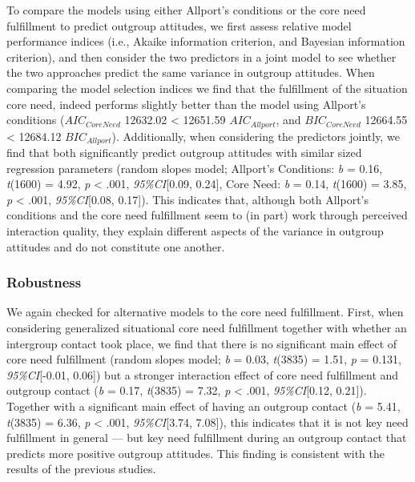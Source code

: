 \documentclass[man, 12pt, a4paper]{apa7}
\theoremstyle{break}
\theoremstyle{plain}
\begin{document}
To compare the models using either Allport's conditions or the core need
fulfillment to predict outgroup attitudes, we first assess relative
model performance indices (i.e., Akaike information criterion, and
Bayesian information criterion), and then consider the two predictors in
a joint model to see whether the two approaches predict the same
variance in outgroup attitudes. When comparing the model selection
indices we find that the fulfillment of the situation core need, indeed
performs slightly better than the model using Allport's conditions
(\(AIC_{CoreNeed}\) 12632.02 \textless{} 12651.59 \(AIC_{Allport}\), and
\(BIC_{CoreNeed}\) 12664.55 \textless{} 12684.12 \(BIC_{Allport}\)).
Additionally, when considering the predictors jointly, we find that both
significantly predict outgroup attitudes with similar sized regression
parameters (random slopes model; Allport's Conditions: \textit{b} =
0.16, \textit{t}(1600) = 4.92, \textit{p} \textless{} .001,
\textit{95\%CI}{[}0.09, 0.24{]}, Core Need: \textit{b} = 0.14,
\textit{t}(1600) = 3.85, \textit{p} \textless{} .001,
\textit{95\%CI}{[}0.08, 0.17{]}). This indicates that, although both
Allport's conditions and the core need fulfillment seem to (in part)
work through perceived interaction quality, they explain different
aspects of the variance in outgroup attitudes and do not constitute one
another.

\subsubsection{Robustness}

We again checked for alternative models to the core need fulfillment.
First, when considering generalized situational core need fulfillment
together with whether an intergroup contact took place, we find that
there is no significant main effect of core need fulfillment (random
slopes model; \textit{b} = 0.03, \textit{t}(3835) = 1.51, \textit{p} =
0.131, \textit{95\%CI}{[}-0.01, 0.06{]}) but a stronger interaction
effect of core need fulfillment and outgroup contact (\textit{b} = 0.17,
\textit{t}(3835) = 7.32, \textit{p} \textless{} .001,
\textit{95\%CI}{[}0.12, 0.21{]}). Together with a significant main
effect of having an outgroup contact (\textit{b} = 5.41,
\textit{t}(3835) = 6.36, \textit{p} \textless{} .001,
\textit{95\%CI}{[}3.74, 7.08{]}), this indicates that it is not key need
fulfillment in general --- but key need fulfillment during an outgroup
contact that predicts more positive outgroup attitudes. This finding is
consistent with the results of the previous studies.
\end{document}
